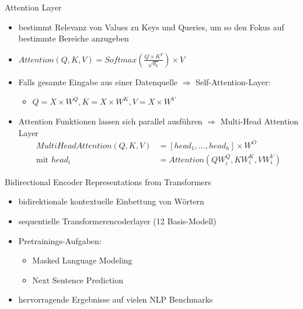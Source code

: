 \begin{frame}{Attention Layer}
  \begin{itemize}
    \item bestimmt Relevanz von Values zu Keys und Queries, um so den Fokus auf bestimmte Bereiche anzugeben
    \item $Attention(Q,K,V) = Softmax(\frac{Q\times K^T}{\sqrt{d_k}})\times V$
    \item Falls gesamte Eingabe aus einer Datenquelle $\Rightarrow$ Self-Attention-Layer: \begin{itemize} \item $Q = X \times W^{Q}, K = X \times W^{K}, V = X \times W^{V}$\end{itemize}
    \item Attention Funktionen lassen sich parallel ausführen $\Rightarrow$ Multi-Head Attention Layer  \begin{equation*}
      \begin{split}
      MultiHeadAttention(Q,K,V) &= [head_1, \ldots, head_h] \times W^{O} \\
      \text{mit } head_i &= Attention(QW_i^Q,KW_i^K,VW_i^V)
      \end{split}
  \end{equation*}
  \end{itemize}
 
\end{frame}

\begin{frame}{Bidirectional Encoder Representations from Transformers}
  \begin{itemize}
    \item bidirektionale kontextuelle Einbettung von Wörtern
    \item sequentielle Transformerencoderlayer (12 Basis-Modell)
    \item Pretrainings-Aufgaben: \begin{itemize} \item Masked Language Modeling \item Next Sentence Prediction \end{itemize}
    \item hervorragende Ergebnisse auf vielen NLP Benchmarks
    
  \end{itemize}
 
\end{frame}

